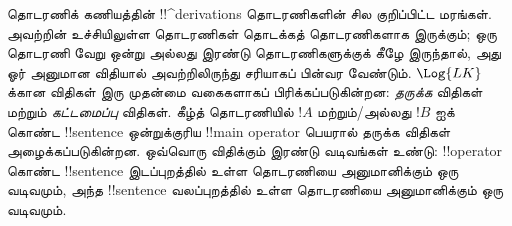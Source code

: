 \documentclass[../../../include/open-logic-section]{subfiles}
\begin{document}
தொடரணிக் கணியத்தின் !!^{derivation}s தொடரணிகளின் சில குறிப்பிட்ட மரங்கள்.
அவற்றின் உச்சியிலுள்ள தொடரணிகள் தொடக்கத் தொடரணிகளாக இருக்கும்; ஒரு தொடரணி
வேறு ஒன்று அல்லது இரண்டு தொடரணிகளுக்குக் கீழே இருந்தால், அது ஓர் அனுமான
விதியால் அவற்றிலிருந்து சரியாகப் பின்வர வேண்டும். $\Log{LK}$ க்கான விதிகள்
இரு முதன்மை வகைகளாகப் பிரிக்கப்படுகின்றன: \emph{தருக்க} விதிகள் மற்றும்
\emph{கட்டமைப்பு} விதிகள். கீழ்த் தொடரணியில் $!A$ மற்றும்/அல்லது $!B$ ஐக்
கொண்ட !!{sentence} ஒன்றுக்குரிய !!{main operator} பெயரால் தருக்க விதிகள்
அழைக்கப்படுகின்றன. ஒவ்வொரு விதிக்கும் இரண்டு வடிவங்கள் உண்டு: !!{operator}
கொண்ட !!{sentence} இடப்புறத்தில் உள்ள தொடரணியை அனுமானிக்கும் ஒரு வடிவமும்,
அந்த !!{sentence} வலப்புறத்தில் உள்ள தொடரணியை அனுமானிக்கும் ஒரு வடிவமும்.
\end{document}
